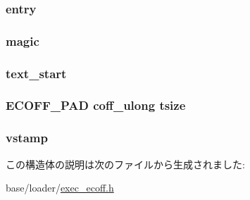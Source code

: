 \label{structecoff__aouthdr_a24ee8a7fed1aa69a99b49589f5fc07a8}
\hypertarget{structecoff__aouthdr_a671b26228224bf0a4bc8d95fde163e7c}{
\subsubsection[{entry}]{ {\bf entry}}}
\label{structecoff__aouthdr_a671b26228224bf0a4bc8d95fde163e7c}
\hypertarget{structecoff__aouthdr_aca6979aeb65157fc85c0d0d530c0297e}{
\subsubsection[{magic}]{ {\bf magic}}}
\label{structecoff__aouthdr_aca6979aeb65157fc85c0d0d530c0297e}
\hypertarget{structecoff__aouthdr_a707429daa5ff7bc42212322fea009fe0}{
\subsubsection[{text\_\-start}]{ {\bf text\_\-start}}}
\label{structecoff__aouthdr_a707429daa5ff7bc42212322fea009fe0}
\hypertarget{structecoff__aouthdr_a6be60df2acc8683822cfcf07fcdc18d7}{
\subsubsection[{tsize}]{\setlength{\rightskip}{0pt plus 5cm}ECOFF\_\-PAD {\bf coff\_\-ulong} {\bf tsize}}}
\label{structecoff__aouthdr_a6be60df2acc8683822cfcf07fcdc18d7}
\hypertarget{structecoff__aouthdr_a6b0efcbed8ed80fdcf7b09271c64769e}{
\subsubsection[{vstamp}]{ {\bf vstamp}}}
\label{structecoff__aouthdr_a6b0efcbed8ed80fdcf7b09271c64769e}


この構造体の説明は次のファイルから生成されました:\begin{DoxyCompactItemize}
\item 
base/loader/\hyperlink{exec__ecoff_8h}{exec\_\-ecoff.h}\end{DoxyCompactItemize}
